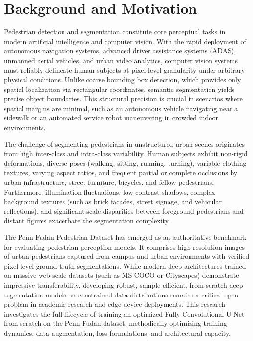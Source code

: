 \documentclass[10pt,a4paper]{report}
\begin{document}
\section{Background and Motivation}
Pedestrian detection and segmentation constitute core perceptual tasks in modern artificial intelligence and computer vision. With the rapid deployment of autonomous navigation systems, advanced driver assistance systems (ADAS), unmanned aerial vehicles, and urban video analytics, computer vision systems must reliably delineate human subjects at pixel-level granularity under arbitrary physical conditions. Unlike coarse bounding box detection, which provides only spatial localization via rectangular coordinates, semantic segmentation yields precise object boundaries. This structural precision is crucial in scenarios where spatial margins are minimal, such as an autonomous vehicle navigating near a sidewalk or an automated service robot maneuvering in crowded indoor environments.

The challenge of segmenting pedestrians in unstructured urban scenes originates from high inter-class and intra-class variability. Human subjects exhibit non-rigid deformations, diverse poses (walking, sitting, running, turning), variable clothing textures, varying aspect ratios, and frequent partial or complete occlusions by urban infrastructure, street furniture, bicycles, and fellow pedestrians. Furthermore, illumination fluctuations, low-contrast shadows, complex background textures (such as brick facades, street signage, and vehicular reflections), and significant scale disparities between foreground pedestrians and distant figures exacerbate the segmentation complexity. 

The Penn-Fudan Pedestrian Dataset \cite{wang2007pennfudan} has emerged as an authoritative benchmark for evaluating pedestrian perception models. It comprises high-resolution images of urban pedestrians captured from campus and urban environments with verified pixel-level ground-truth segmentations. While modern deep architectures trained on massive web-scale datasets (such as MS COCO or Cityscapes) demonstrate impressive transferability, developing robust, sample-efficient, from-scratch deep segmentation models on constrained data distributions remains a critical open problem in academic research and edge-device deployments. This research investigates the full lifecycle of training an optimized Fully Convolutional U-Net \cite{ronneberger2015unet} from scratch on the Penn-Fudan dataset, methodically optimizing training dynamics, data augmentation, loss formulations, and architectural capacity.
\end{document}
